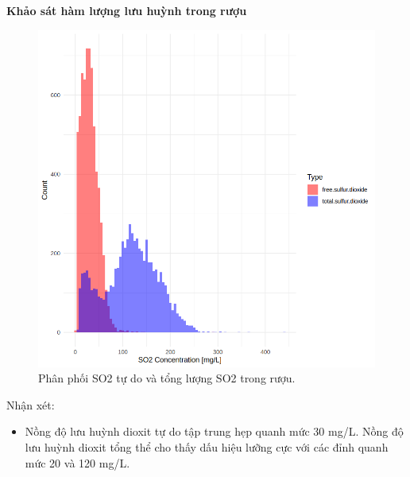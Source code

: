 \textbf{Khảo sát hàm lượng lưu huỳnh trong rượu}
\begin{figure}[H]
    \centering
    \includegraphics[width=0.75\columnwidth]{wine_colors/wine_sulfur.png}
    \caption{Phân phối SO2 tự do và tổng lượng SO2 trong rượu.}
    \label{fig:wine_sulfur_dis}
\end{figure}
Nhận xét:
\begin{itemize}
    \item Nồng độ lưu huỳnh dioxit tự do tập trung hẹp quanh mức 30 mg/L. Nồng độ lưu huỳnh dioxit tổng thể cho thấy dấu hiệu lưỡng cực với các đỉnh quanh mức 20 và 120 mg/L.
\end{itemize}

